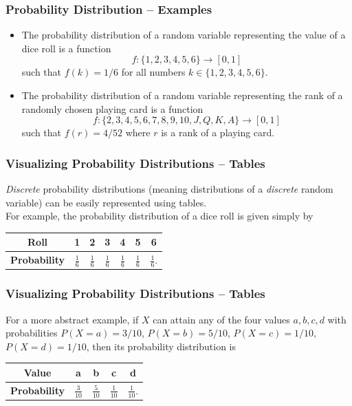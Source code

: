 \documentclass[aspectratio=169,11pt,usenames,dvipsnames]{beamer}
\begin{document}
\begin{frame}
 \frametitle{Probability Distribution -- Examples}
 \begin{itemize}
  \item The \alert{probability distribution} of a random variable representing
   the value of a dice roll is a function
   \[
    f: \{1,2,3,4,5,6\} \to [0,1]
   \]
   such that $f(k) = 1 / 6$ for all numbers $k \in \{1,2,3,4,5,6\}$.
  \pause
  \item The \alert{probability distribution} of a random variable representing
   the rank of a randomly chosen playing card is a function
   \pause
   \[
    f: \{2,3,4,5,6,7,8,9,10,J,Q,K,A\} \to [0,1]
   \]
   such that $f(r) = 4 / 52$ where $r$ is a rank of a playing card.
 \end{itemize}
\end{frame}

\begin{frame}
 \frametitle{Visualizing Probability Distributions -- Tables}
 \emph{Discrete} \alert{probability distributions} (meaning distributions of a
 \emph{discrete} random variable) can be easily represented using
 \alert{tables}.\\ \pause
 For example, the probability distribution of a dice roll is given simply by
 \begin{center}
  \begin{tabular}{c|cccccc}
   \textbf{Roll} & 1 & 2 & 3 & 4 & 5 & 6\\
   \midrule
   \textbf{Probability} & $\frac{1}{6}$ & $\frac{1}{6}$ &$\frac{1}{6}$
                        &$\frac{1}{6}$ &$\frac{1}{6}$ &$\frac{1}{6}$.
  \end{tabular}
 \end{center}
\end{frame}

\begin{frame}
 \frametitle{Visualizing Probability Distributions -- Tables}
 For a more abstract example, if $X$ can attain any of the four values $a,b,c,d$
 with probabilities $P(X = a) = 3 / 10$, $P(X = b) = 5 / 10$, $P(X = c) = 1 /
 10$, $P(X = d) = 1 / 10$, then its probability distribution is
 \begin{center}
  \begin{tabular}{c|cccc}
   \textbf{Value} & a & b & c & d\\
   \midrule
   \textbf{Probability} & $\frac{3}{10}$ & $\frac{5}{10}$ & $\frac{1}{10}$ &
   $\frac{1}{10}$.
  \end{tabular}
 \end{center}
\end{frame}
\end{document}
